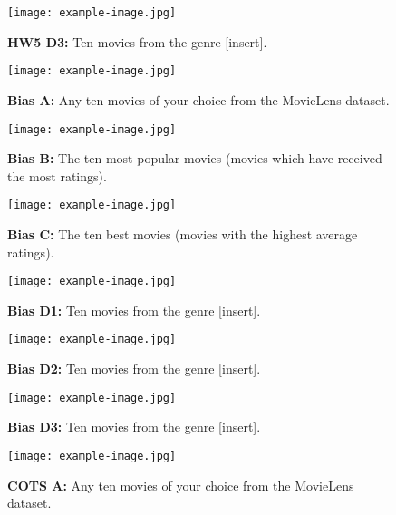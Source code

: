 \begin{figure}[!h]
    \centering
    \texttt{[image: example-image.jpg]}
    \caption{\textbf{HW5 D3:} Ten movies from the genre [insert].}
    \label{fig:hw5-vis-d3}
\end{figure}

\begin{figure}[!h]
    \centering
    \texttt{[image: example-image.jpg]}
    \caption{\textbf{Bias A:} Any ten movies of your choice from the MovieLens dataset.}
    \label{fig:bias-vis-a}
\end{figure}

\begin{figure}[!h]
    \centering
    \texttt{[image: example-image.jpg]}
    \caption{\textbf{Bias B:} The ten most popular movies (movies which have received the most ratings).}
    \label{fig:bias-vis-b}
\end{figure}

\begin{figure}[!h]
    \centering
    \texttt{[image: example-image.jpg]}
    \caption{\textbf{Bias C:} The ten best movies (movies with the highest average ratings).}
    \label{fig:bias-vis-c}
\end{figure}

\begin{figure}[!h]
    \centering
    \texttt{[image: example-image.jpg]}
    \caption{\textbf{Bias D1:} Ten movies from the genre [insert].}
    \label{fig:bias-vis-d1}
\end{figure}

\begin{figure}[!h]
    \centering
    \texttt{[image: example-image.jpg]}
    \caption{\textbf{Bias D2:} Ten movies from the genre [insert].}
    \label{fig:bias-vis-d2}
\end{figure}

\begin{figure}[!h]
    \centering
    \texttt{[image: example-image.jpg]}
    \caption{\textbf{Bias D3:} Ten movies from the genre [insert].}
    \label{fig:bias-vis-d3}
\end{figure}

\begin{figure}[!h]
    \centering
    \texttt{[image: example-image.jpg]}
    \caption{\textbf{COTS A:} Any ten movies of your choice from the MovieLens dataset.}
    \label{fig:cots-vis-a}
\end{figure}

